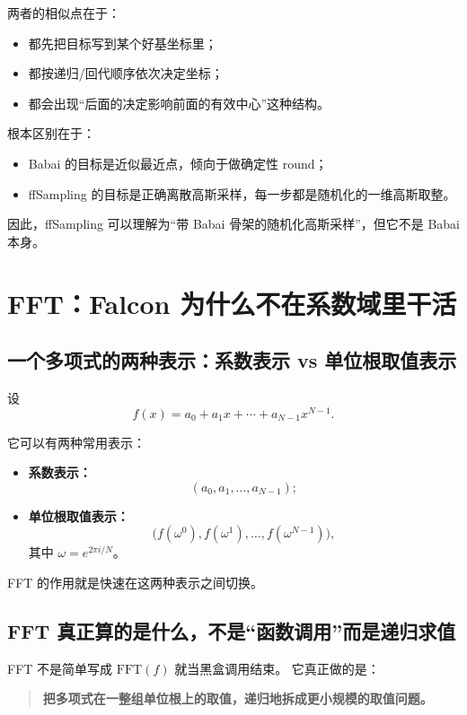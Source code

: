 \documentclass[11pt,a4paper]{ctexart}
\begin{document}
两者的相似点在于：

\begin{itemize}
    \item 都先把目标写到某个好基坐标里；
    \item 都按递归/回代顺序依次决定坐标；
    \item 都会出现“后面的决定影响前面的有效中心”这种结构。
\end{itemize}

根本区别在于：

\begin{itemize}
    \item Babai 的目标是近似最近点，倾向于做确定性 round；
    \item ffSampling 的目标是正确离散高斯采样，每一步都是随机化的一维高斯取整。
\end{itemize}

因此，ffSampling 可以理解为“带 Babai 骨架的随机化高斯采样”，但它不是 Babai 本身。

\section{FFT：Falcon 为什么不在系数域里干活}

\subsection{一个多项式的两种表示：系数表示 vs 单位根取值表示}

设
\[
f(x)=a_0+a_1x+\cdots+a_{N-1}x^{N-1}.
\]

它可以有两种常用表示：

\begin{itemize}
    \item \textbf{系数表示：}
    \[
    (a_0,a_1,\dots,a_{N-1});
    \]
    \item \textbf{单位根取值表示：}
    \[
    \bigl(f(\omega^0),f(\omega^1),\dots,f(\omega^{N-1})\bigr),
    \]
    其中 \(\omega=e^{2\pi i/N}\)。
\end{itemize}

FFT 的作用就是快速在这两种表示之间切换。

\subsection{FFT 真正算的是什么，不是“函数调用”而是递归求值}

FFT 不是简单写成 \(\mathrm{FFT}(f)\) 就当黑盒调用结束。  
它真正做的是：

\begin{quote}
\textbf{把多项式在一整组单位根上的取值，递归地拆成更小规模的取值问题。}
\end{quote}
\end{document}

